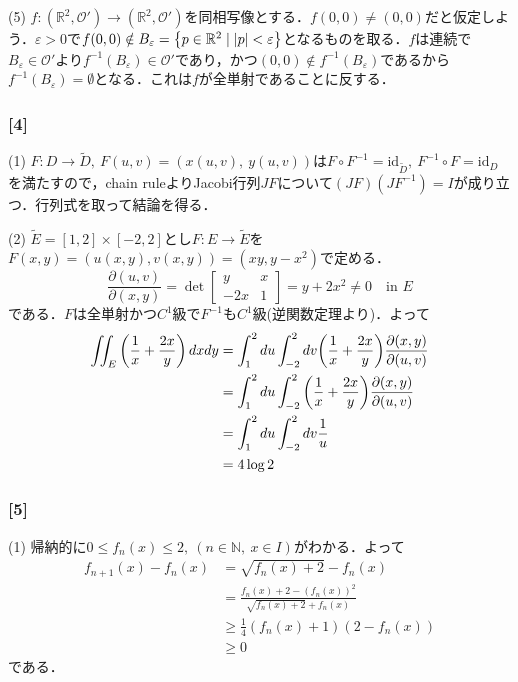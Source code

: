 \documentclass[a4j]{ltjsarticle}
\newcommand{\Rset}{\mathbb{R}}
\newcommand{\Nset}{\mathbb{N}}
\newcommand{\1}{\mathbbm{1}}
\numberwithin{equation}{section}
\theoremstyle{definition}
\begin{document}
(5) $f\colon (\Rset^2,\mathcal{O}')\to(\Rset^2,\mathcal{O}')$を同相写像とする．$f(0,0)\neq(0,0)$だと仮定しよう．$\varepsilon>0$で$f(0,0)\notin B_\varepsilon=\qty{p\in \Rset^2\mid \abs{p}<\varepsilon}$となるものを取る．$f$は連続で$B_{\varepsilon}\in\mathcal{O}'$より$f^{-1}(B_{\varepsilon})\in\mathcal{O}'$であり，かつ$(0,0)\notin f^{-1}(B_{\varepsilon})$であるから$f^{-1}(B_{\varepsilon})=\emptyset$となる．これは$f$が全単射であることに反する．

\subsubsection*{[4]}
(1) $F\colon D\to \widetilde{D},\ F(u,v)=(x(u,v),\ y(u,v))$は$F\circ F^{-1}=\mathrm{id}_{\widetilde{D}},\ F^{-1}\circ F=\mathrm{id}_{D}$を満たすので，chain ruleよりJacobi行列$JF$について$(JF)(JF^{-1})=I$が成り立つ．行列式を取って結論を得る．

(2) $\widetilde{E}=[1,2]\times [-2,2]$とし$F\colon E\to \widetilde{E}$を$F(x,y)=(u(x,y),v(x,y))=(xy,y-x^2)$で定める．
\begin{equation}
    \frac{\partial(u,v)}{\partial(x,y)}=\det\begin{bmatrix}
        y & x \\
        -2x & 1 
    \end{bmatrix}=y+2x^2\neq0\quad \text{in $E$}
\end{equation}
である．$F$は全単射かつ$C^1$級で$F^{-1}$も$C^1$級(逆関数定理より)．よって
\begin{align}
    \iint_{E}\qty(\frac{1}{x}+\frac{2x}{y})\,dxdy&=\int_1^2du\int_{-2}^{2}dv\qty(\frac{1}{x}+\frac{2x}{y})\frac{\partial(x,y)}{\partial(u,v)}\\
    &=\int_1^2du\int_{-2}^{2}\qty(\frac{1}{x}+\frac{2x}{y})\frac{\partial(x,y)}{\partial(u,v)}\\
    &=\int_{1}^2du\int_{-2}^2dv\frac{1}{u}\\
    &=4\log2
\end{align}

\subsubsection*{[5]}
(1) 帰納的に$0\leq f_n(x)\leq 2,\ (n\in\Nset,\ x\in I)$がわかる．よって
\begin{align}
    f_{n+1}(x)-f_n(x)&=\sqrt{f_n(x)+2}-f_n(x)\\
    &=\frac{f_n(x)+2-(f_n(x))^2}{\sqrt{f_n(x)+2}+f_n(x)}\\
    &\geq \frac{1}{4}(f_n(x)+1)(2-f_n(x))\\
    &\geq0 
\end{align}
である．
\end{document}
